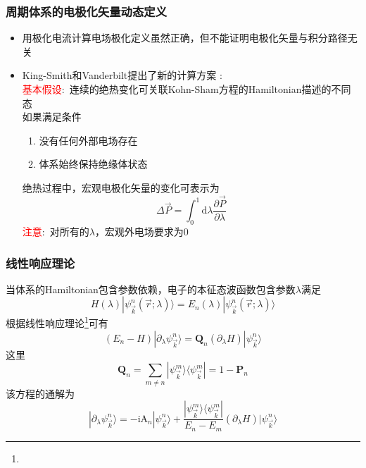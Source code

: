 {\frame
{
	\frametitle{周期体系的电极化矢量动态定义}
	\begin{itemize}
		\item 用极化电流计算电场极化定义虽然正确，但不能证明电极化矢量与积分路径无关
		\item \textrm{King-Smith}和\textrm{Vanderbilt}提出了新的计算方案%
			:\\
		\textcolor{red}{基本假设}:~连续的绝热变化可关联\textrm{Kohn-Sham}方程的\textrm{Hamiltonian}描述的不同态\\如果满足条件
	\begin{enumerate}
\setlength{\itemsep}{10pt}
		\item 没有任何外部电场存在 
		\item 体系始终保持绝缘体状态
	\end{enumerate}
	绝热过程中，宏观电极化矢量的变化可表示为
	\begin{displaymath}
		\Delta\vec P=\int_0^1\mathrm{d}\lambda\frac{\partial\vec P}{\partial\lambda}
	\end{displaymath}
	\textcolor{red}{注意}:~对所有的$\lambda$，宏观外电场要求为0
	\end{itemize}
}

\frame
{
	\frametitle{线性响应理论}
	当体系的\textrm{Hamiltonian}包含参数依赖，电子的本征态波函数包含参数$\lambda$满足
	\begin{displaymath}
		H(\lambda)|\psi_{\vec k}^{n}(\vec r;\lambda)\rangle=E_n(\lambda)|\psi_{\vec k}^{n}(\vec r;\lambda)\rangle
	\end{displaymath}
	根据线性响应理论\footnote{\fontsize{6.0pt}{3.2pt}}可有
	\begin{displaymath}
		(E_n-H)|\partial_{\lambda}\psi_{\vec k}^{n}\rangle=\mathbf{Q}_n(\partial_{\lambda}H)|\psi_{\vec k}^{n}\rangle
	\end{displaymath}
	这里
	\begin{displaymath}
		\mathbf{Q}_n=\sum_{m\neq n}|\psi_{\vec k}^{m}\rangle\langle\psi_{\vec k}^{m}|=1-\mathbf{P}_n
	\end{displaymath}
	该方程的通解为
	\begin{displaymath}
		|\partial_{\lambda}\psi_{\vec k}^{n}\rangle=-\mathrm{i}\mathrm{A}_n|\psi_{\vec k}^{n}\rangle+\dfrac{|\psi_{\vec k}^{m}\rangle\langle\psi_{\vec k}^{m}|}{E_n-E_m}(\partial_{\lambda}H)|\psi_{\vec k}^{n}\rangle
	\end{displaymath}
}

}
